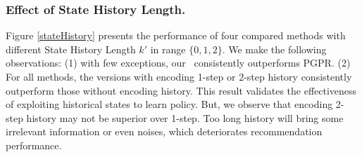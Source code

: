 \subsubsection{\textbf{Effect of State History Length.}}
Figure \ref{stateHistory} presents the performance of four compared methods with different State History Length $k'$ in range $\{0,1,2\}$. We make the following observations: (1) with few exceptions, our \tkgrec\ consistently outperforms PGPR. (2) For all methods, the versions with encoding 1-step or 2-step history consistently outperform those without encoding history. This result validates the effectiveness of exploiting historical states to learn policy. But, we observe that encoding 2-step history may not be superior over 1-step. Too long history will bring some irrelevant information or even noises, which deteriorates recommendation performance.   
 
%
%
%


